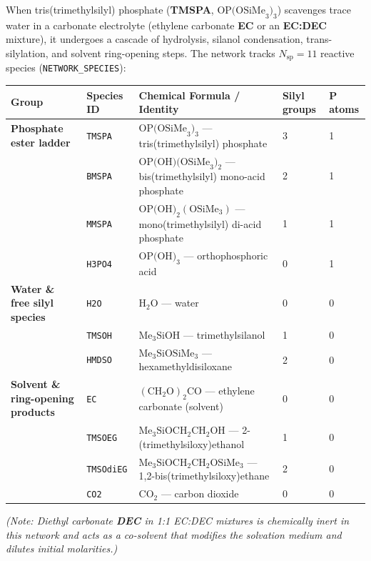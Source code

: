 \documentclass[11pt,a4paper]{article}
\begin{document}
When tris(trimethylsilyl) phosphate (\textbf{TMSPA}, $\text{OP(OSiMe}_3)_3$) scavenges trace water in a carbonate electrolyte (ethylene carbonate \textbf{EC} or an \textbf{EC:DEC} mixture), it undergoes a cascade of hydrolysis, silanol condensation, trans-silylation, and solvent ring-opening steps. The network tracks $N_{\text{sp}} = 11$ reactive species (\texttt{NETWORK\_\allowbreak{}SPECIES}):

\begin{tabularx}{\textwidth}{L{3.3cm} L{1.7cm} Y C{1.4cm} C{1.4cm}}
\toprule
\textbf{Group} & \textbf{Species ID} & \textbf{Chemical Formula / Identity} & \textbf{Silyl groups} & \textbf{P atoms} \\
\midrule
\textbf{Phosphate ester ladder} & \texttt{TMSPA} & $\text{OP(OSiMe}_3)_3$ --- tris(trimethylsilyl) phosphate & 3 & 1 \\
 & \texttt{BMSPA} & $\text{OP(OH)(OSiMe}_3)_2$ --- bis(trimethylsilyl) mono-acid phosphate & 2 & 1 \\
 & \texttt{MMSPA} & $\text{OP(OH)}_2(\text{OSiMe}_3)$ --- mono(trimethylsilyl) di-acid phosphate & 1 & 1 \\
 & \texttt{H3PO4} & $\text{OP(OH)}_3$ --- orthophosphoric acid & 0 & 1 \\
\midrule
\textbf{Water \& free silyl species} & \texttt{H2O} & $\text{H}_2\text{O}$ --- water & 0 & 0 \\
 & \texttt{TMSOH} & $\text{Me}_3\text{SiOH}$ --- trimethylsilanol & 1 & 0 \\
 & \texttt{HMDSO} & $\text{Me}_3\text{SiOSiMe}_3$ --- hexamethyldisiloxane & 2 & 0 \\
\midrule
\textbf{Solvent \& ring-opening products} & \texttt{EC} & $(\text{CH}_2\text{O})_2\text{CO}$ --- ethylene carbonate (solvent) & 0 & 0 \\
 & \texttt{TMSOEG} & $\text{Me}_3\text{SiOCH}_2\text{CH}_2\text{OH}$ --- 2-(trimethylsiloxy)ethanol & 1 & 0 \\
 & \texttt{TMSOdiEG} & $\text{Me}_3\text{SiOCH}_2\text{CH}_2\text{OSiMe}_3$ --- 1,2-bis(trimethylsiloxy)ethane & 2 & 0 \\
 & \texttt{CO2} & $\text{CO}_2$ --- carbon dioxide & 0 & 0 \\
\bottomrule
\end{tabularx}

\medskip
\emph{(Note: Diethyl carbonate \textbf{DEC} in 1:1 EC:DEC mixtures is chemically inert in this network and acts as a co-solvent that modifies the solvation medium and dilutes initial molarities.)}
\end{document}
